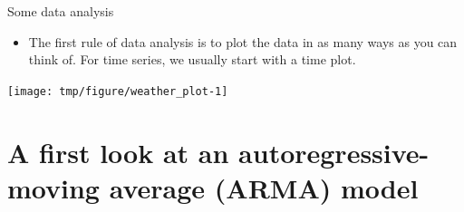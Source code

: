 \begin{frame}{Some data analysis}

\begin{itemize}

\item The first rule of data analysis is to plot the data in as many ways as you can think of. For time series, we usually start with a time plot.

\end{itemize}

\begin{knitrout}\small
{}\color{fgcolor}\begin{kframe}
\begin{alltt}
\hlstd{=}\hlstd{)}
\end{alltt}
\end{kframe}
\end{knitrout}

\begin{knitrout}\small
{}\color{fgcolor}

{\centering \texttt{[image: tmp/figure/weather\_plot-1]} 

}


\end{knitrout}

\end{frame}

\section{A first look at an autoregressive-moving average (ARMA) model}

